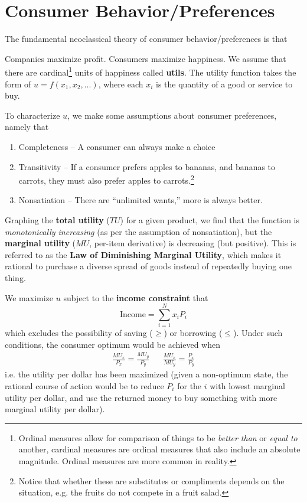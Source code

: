 \documentclass{article}
\begin{document}
\section{Consumer Behavior/Preferences}\label{sec:consumer}
The fundamental neoclassical theory of consumer behavior/preferences is that
\begin{outline}
	\1 Companies maximize profit.
	\1 Consumers maximize happiness.
	    \2 We assume that there are cardinal\footnote{Ordinal measures allow for comparison of things to be \textit{better than} or \textit{equal to} another, cardinal measures are ordinal measures that also include an absolute magnitude. Ordinal measures are more common in reality.} units of happiness called \textbf{utils}.
	    \2 The utility function takes the form of $u=f(x_1,x_2,...)$, where each $x_i$ is the quantity of a good or service to buy.
\end{outline}
To characterize $u$, we make some assumptions about consumer preferences, namely that
\begin{enumerate}
	\item Completeness -- A consumer can always make a choice
	\item Transitivity -- If a consumer prefers apples to bananas, and bananas to carrots, they must also prefer apples to carrots.\footnote{Notice that whether these are substitutes or compliments depends on the situation, e.g. the fruits do not compete in a fruit salad.}
	\item Nonsatiation -- There are ``unlimited wants,'' more is always better.
\end{enumerate}
Graphing the \textbf{total utility} ($TU$) for a given product, we find that the function is \textit{monotonically increasing} (as per the assumption of nonsatiation), but the \textbf{marginal utility} ($MU$, per-item derivative) is decreasing (but positive). This is referred to as the \textbf{Law of Diminishing Marginal Utility}, which makes it rational to purchase a diverse spread of goods instead of repeatedly buying one thing.

We maximize $u$ subject to the \textbf{income constraint} that
\[\textrm{Income} = \sum_{i=1}^N x_i P_i\]
which excludes the possibility of saving ($\ge$) or borrowing ($\le$). Under such conditions, the consumer optimum would be achieved when
\begin{align*}
    \frac{MU_x}{P_x}=\frac{MU_y}{P_y} &&
    \frac{MU_x}{MU_y}=\frac{P_x}{P_y}
\end{align*}
i.e. the utility per dollar has been maximized (given a non-optimum state, the rational course of action would be to reduce
$P_i$ for the $i$ with lowest marginal utility per dollar, and use the returned money to buy something with more marginal utility per dollar).
\end{document}
